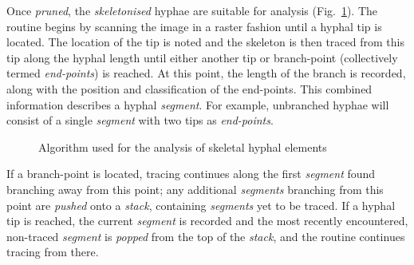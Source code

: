 Once \emph{pruned}, the \emph{skeletonised} hyphae are suitable for analysis (Fig.~\ref{fig:HAAlg}). The routine begins by scanning the image in a raster fashion until a hyphal tip is located. The location of the tip is noted and the skeleton is then traced from this tip along the hyphal length until either another tip or branch-point (collectively termed \emph{end-points}) is reached. At this point, the length of the branch is recorded, along with the position and classification of the end-points. This combined information describes a hyphal \emph{segment}. For example, unbranched hyphae will consist of a single \emph{segment} with two tips as \emph{end-points}.

\begin{figure}[htbp]
	\centering
	\caption{Algorithm used for the analysis of skeletal hyphal elements}
	\label{fig:HAAlg}
\end{figure}

If a branch-point is located, tracing continues along the first \emph{segment} found branching away from this point; any additional \emph{segments} branching from this point are \emph{pushed} onto a \emph{stack}, containing \emph{segments} yet to be traced. If a hyphal tip is reached, the current \emph{segment} is recorded and the most recently encountered, non-traced \emph{segment} is \emph{popped} from the top of the \emph{stack}, and the routine continues tracing from there.

